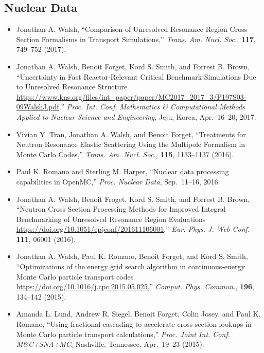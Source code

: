 \subsection{Nuclear Data}

\begin{itemize}

\item Jonathan A. Walsh, ``Comparison of Unresolved Resonance Region Cross Section
Formalisms in Transport Simulations,'' \textit{Trans. Am. Nucl. Soc.}, \textbf{117},
749--752 (2017).

\item Jonathan A. Walsh, Benoit Forget, Kord S. Smith, and Forrest B. Brown,
``Uncertainty in Fast Reactor-Relevant Critical Benchmark Simulations Due to
Unresolved Resonance Structure
\url{https://www.kns.org/files/int_paper/paper/MC2017_2017_3/P197S03-09WalshJ.pdf},''
\textit{Proc. Int. Conf. Mathematics \& Computational Methods Applied to Nuclear
Science and Engineering}, Jeju, Korea, Apr.\ 16--20, 2017.

\item Vivian Y. Tran, Jonathan A. Walsh, and Benoit Forget, ``Treatments for Neutron
Resonance Elastic Scattering Using the Multipole Formalism in Monte Carlo
Codes,'' \textit{Trans. Am. Nucl. Soc.}, \textbf{115}, 1133--1137 (2016).

\item Paul K. Romano and Sterling M. Harper, ``Nuclear data processing capabilities
in OpenMC,'' \textit{Proc. Nuclear Data}, Sep.\ 11--16, 2016.

\item Jonathan A. Walsh, Benoit Froget, Kord S. Smith, and Forrest B. Brown,
``Neutron Cross Section Processing Methods for Improved Integral Benchmarking
of Unresolved Resonance Region Evaluations
\url{https://doi.org/10.1051/epjconf/201611106001},'' \textit{Eur. Phys. J. Web Conf.}
\textbf{111}, 06001 (2016).

\item Jonathan A. Walsh, Paul K. Romano, Benoit Forget, and Kord S. Smith,
``Optimizations of the energy grid search algorithm in continuous-energy Monte
Carlo particle transport codes
\url{https://doi.org/10.1016/j.cpc.2015.05.025},'' \textit{Comput. Phys. Commun.},
\textbf{196}, 134--142 (2015).

\item Amanda L. Lund, Andrew R. Siegel, Benoit Forget, Colin Josey, and
Paul K. Romano, ``Using fractional cascading to accelerate cross section
lookups in Monte Carlo particle transport calculations,'' \textit{Proc. Joint
Int. Conf. M\&C+SNA+MC}, Nashville, Tennessee, Apr.\ 19--23 (2015).


\end{itemize}
